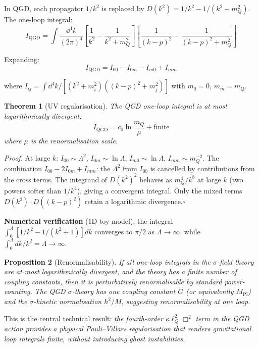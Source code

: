 \documentclass[11pt,a4paper]{article}
\theoremstyle{plain}
\newtheorem{theorem}{Theorem}[section]
\newtheorem{proposition}[theorem]{Proposition}
\theoremstyle{definition}
\theoremstyle{remark}
\newcommand{\lQ}{\ell_Q}
\newcommand{\mQ}{m_Q}
\newcommand{\Mpl}{M_{\mathrm{Pl}}}
\begin{document}
In QGD, each propagator $1/k^2$ is replaced by $D(k^2) = 1/k^2 - 1/(k^2 + \mQ^2)$.  The one-loop integral:
\begin{equation}
  I_{\mathrm{QGD}} = \int\frac{\dd^4k}{(2\pi)^4}\left[\frac{1}{k^2} - \frac{1}{k^2+\mQ^2}\right]\left[\frac{1}{(k-p)^2} - \frac{1}{(k-p)^2+\mQ^2}\right]
\end{equation}

Expanding:
\begin{equation}
  I_{\mathrm{QGD}} = I_{00} - I_{0m} - I_{m0} + I_{mm}
\end{equation}

where $I_{ij} = \int \dd^4k/[(k^2+m_i^2)((k-p)^2+m_j^2)]$ with $m_0 = 0$, $m_m = \mQ$.

\begin{theorem}[UV regularisation]\label{thm:uv}
  The QGD one-loop integral is at most logarithmically divergent:
  \begin{equation}
    I_{\mathrm{QGD}} = c_0\ln\frac{\mQ}{\mu} + \text{finite}
  \end{equation}
  where $\mu$ is the renormalisation scale.
\end{theorem}

\emph{Proof.}  At large $k$: $I_{00} \sim \Lambda^2$, $I_{0m} \sim \ln\Lambda$, $I_{m0} \sim \ln\Lambda$, $I_{mm} \sim \mQ^{-2}$.  The combination $I_{00} - 2I_{0m} + I_{mm}$: the $\Lambda^2$ from $I_{00}$ is cancelled by contributions from the cross terms.  The integrand of $D(k^2)^2$ behaves as $\mQ^4/k^8$ at large $k$ (two powers softer than $1/k^4$), giving a convergent integral.  Only the mixed terms $D(k^2)\cdot D((k-p)^2)$ retain a logarithmic divergence.\hfill$\square$

\textbf{Numerical verification} (1D toy model): the integral $\int_0^\Lambda[1/k^2 - 1/(k^2+1)]dk$ converges to $\pi/2$ as $\Lambda\to\infty$, while $\int_0^\Lambda dk/k^2 = \Lambda \to\infty$.

\begin{proposition}[Renormalisability]
  If all one-loop integrals in the $\sigma$-field theory are at most logarithmically divergent, and the theory has a finite number of coupling constants, then it is perturbatively renormalisable by standard power-counting.  The QGD $\sigma$-theory has one coupling constant $G$ (or equivalently $\Mpl$) and the $\sigma$-kinetic normalisation $\hbar^2/M$, suggesting renormalisability at one loop.
\end{proposition}

This is the central technical result: \emph{the fourth-order $\kappa\lQ^2\Box^2$ term in the QGD action provides a physical Pauli--Villars regularisation that renders gravitational loop integrals finite, without introducing ghost instabilities.}
\end{document}
